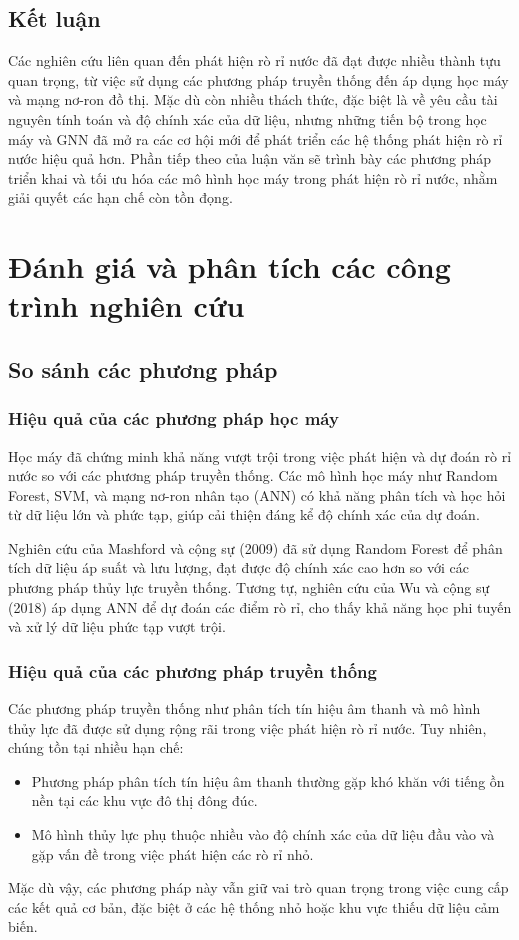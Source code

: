 \subsection{Kết luận}
Các nghiên cứu liên quan đến phát hiện rò rỉ nước đã đạt được nhiều thành tựu quan trọng, từ việc sử dụng các phương pháp truyền thống đến áp dụng học máy và mạng nơ-ron đồ thị. Mặc dù còn nhiều thách thức, đặc biệt là về yêu cầu tài nguyên tính toán và độ chính xác của dữ liệu, nhưng những tiến bộ trong học máy và GNN đã mở ra các cơ hội mới để phát triển các hệ thống phát hiện rò rỉ nước hiệu quả hơn. Phần tiếp theo của luận văn sẽ trình bày các phương pháp triển khai và tối ưu hóa các mô hình học máy trong phát hiện rò rỉ nước, nhằm giải quyết các hạn chế còn tồn đọng.

\section{Đánh giá và phân tích các công trình nghiên cứu}

\subsection{So sánh các phương pháp}

\subsubsection{Hiệu quả của các phương pháp học máy}

Học máy đã chứng minh khả năng vượt trội trong việc phát hiện và dự đoán rò rỉ nước so với các phương pháp truyền thống. Các mô hình học máy như Random Forest, SVM, và mạng nơ-ron nhân tạo (ANN) có khả năng phân tích và học hỏi từ dữ liệu lớn và phức tạp, giúp cải thiện đáng kể độ chính xác của dự đoán.

Nghiên cứu của Mashford và cộng sự (2009) đã sử dụng Random Forest để phân tích dữ liệu áp suất và lưu lượng, đạt được độ chính xác cao hơn so với các phương pháp thủy lực truyền thống. Tương tự, nghiên cứu của Wu và cộng sự (2018) áp dụng ANN để dự đoán các điểm rò rỉ, cho thấy khả năng học phi tuyến và xử lý dữ liệu phức tạp vượt trội.

\subsubsection{Hiệu quả của các phương pháp truyền thống}
Các phương pháp truyền thống như phân tích tín hiệu âm thanh và mô hình thủy lực đã được sử dụng rộng rãi trong việc phát hiện rò rỉ nước. Tuy nhiên, chúng tồn tại nhiều hạn chế:
\begin{itemize}
    \item Phương pháp phân tích tín hiệu âm thanh thường gặp khó khăn với tiếng ồn nền tại các khu vực đô thị đông đúc.
    \item Mô hình thủy lực phụ thuộc nhiều vào độ chính xác của dữ liệu đầu vào và gặp vấn đề trong việc phát hiện các rò rỉ nhỏ.
\end{itemize}
Mặc dù vậy, các phương pháp này vẫn giữ vai trò quan trọng trong việc cung cấp các kết quả cơ bản, đặc biệt ở các hệ thống nhỏ hoặc khu vực thiếu dữ liệu cảm biến.

